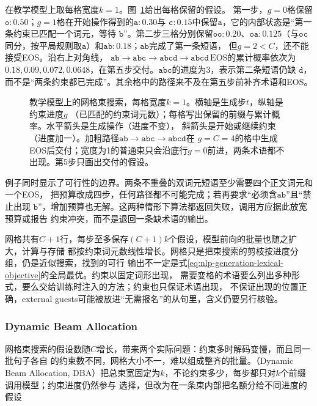 在教学模型上取每格宽度$k=1$。图~\ref{fig:nlp-generation-gbs-grid}给出每格保留的假设。
第一步，$g=0$格保留$\mathtt o:0.50$；$g=1$格在开始操作得到的$\mathtt a:0.30$与
$\mathtt c:0.15$中保留$\mathtt a$，它的内部状态是“第一条约束已匹配一个词元，等待
$\mathtt b$”。第二步三格分别保留$\mathtt{oo}:0.20$、$\mathtt{oa}:0.125$（与$\mathtt{oc}$
同分，按平局规则取$\mathtt a$）和$\mathtt{ab}:0.18$；$\mathtt{ab}$完成了第一条短语，
但$g=2<C$，还不能接受EOS。沿右上对角线，
$\mathtt{ab}\to\mathtt{abc}\to\mathtt{abcd}\to\mathtt{abcd}\,\mathrm{EOS}$的累计概率依次为
$0.18,0.09,0.072,0.0648$，在第五步交付。$\mathtt{abc}$的进度为3，表示第二条短语仍缺
$\mathtt d$，而不是“两条约束都已完成”。其余格中的路径来不及在第五步前补齐术语和EOS。

\begin{figure}[htbp]
  \centering
  
  \caption{教学模型上的网格束搜索，每格宽度$k=1$。横轴是生成步$t$，纵轴是约束进度$g$
  （已匹配的约束词元数）；每格写出保留的前缀与累计概率。水平箭头是生成操作（进度不变），
  斜箭头是开始或继续约束（进度加一）。加粗路径$\mathtt{ab}\to\mathtt{abc}\to\mathtt{abcd}$在
  $g=C=4$的格中生成EOS后交付；宽度为1的普通束只会沿底行$g=0$前进，两条术语都不出现。第5步只画出交付的假设。}
  \label{fig:nlp-generation-gbs-grid}
\end{figure}

例子同时显示了可行性的边界。两条不重叠的双词元短语至少需要四个正文词元和一个EOS，
把预算改成四步，任何路径都不可能完成；若再要求“必须含$\mathtt{ab}$”且“禁止出现
$\mathtt b$”，增加预算也无解。这两种情形下算法都返回失败，调用方应据此放宽预算或报告
约束冲突，而不是退回一条缺术语的输出。

网格共有$C+1$行，每步至多保存$(C+1)k$个假设，模型前向的批量也随之扩大，计算与存储
都按约束词元数线性增长。网格只是把束搜索的剪枝按进度分组，仍是近似搜索，找到的可行
输出不一定是式\eqref{eq:nlp-generation-lexical-objective}的全局最优。约束以固定词形出现，
需要变格的术语要么列出多种形式，要么交给训练时注入的方法；约束也只保证术语出现，
不保证出现的位置正确，external guests可能被放进“无需报名”的从句里，含义仍要另行核验。

\subsubsection{Dynamic Beam Allocation}
\label{sec:nlp-generation-dba}

网格束搜索的假设数随$C$增长，带来两个实际问题：约束多时解码变慢，而且同一批句子各自
的约束数不同，网格大小不一，难以组成整齐的批量。（Dynamic Beam Allocation,
DBA）把总束宽固定为$k$，不论约束多少，每步都只对$k$个前缀调用模型；约束进度仍然参与
选择，但改为在一条束内部把名额分给不同进度的假设

